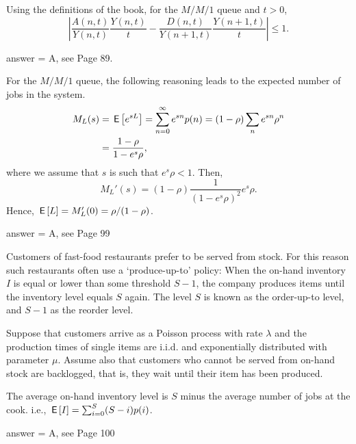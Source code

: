 \begin{exercise}[201803]
Using the definitions of the book, for the $M/M/1$ queue and $t>0$, 
\begin{equation*}
\left|  \frac{A(n,t)}{Y(n,t)}\frac{Y(n,t)}t - \frac{D(n,t)}{Y(n+1,t)}\frac{Y(n+1,t)}t \right| \leq 1. 
\end{equation*}
\begin{solution}
answer = A, see Page 89. 
\end{solution}
\end{exercise}

\begin{exercise}[201803]
For the $M/M/1$ queue, the following reasoning leads to the expected number of jobs in the system.
\begin{equation*}
  \begin{split}
  M_L(s) 
&= \,\mathsf{E}\left[e^{s L}\right] = \sum_{n=0}^\infty e^{s n}p(n) = (1-\rho) \sum_n e^{s n} \rho^n \\
&=\frac{1-\rho}{1-e^{s}\rho},
  \end{split}
\end{equation*}
where we assume that $s$ is such that $e^s \rho < 1$. Then, 
\begin{equation*}
  M_L'(s) = (1-\rho) \frac{1}{(1-e^s\rho)^2} e^s \rho.
\end{equation*}
Hence, $\,\mathsf{E}\left[L\right] = M_L'(0) = \rho/(1-\rho)$.
\begin{solution}
answer = A, see Page 99
\end{solution}
\end{exercise}

\begin{exercise}[201803]
Customers of fast-food restaurants prefer to be served from stock. For this reason such
restaurants often use a `produce-up-to' policy: When the on-hand inventory $I$ is equal or lower than some threshold $S-1$, the company produces items until the inventory level equals $S$ again. The level $S$ is known as the order-up-to level, and $S-1$ as the reorder level.

Suppose that customers arrive as a Poisson process with rate $\lambda$
and the production times of single items are i.i.d. and exponentially
distributed with parameter $\mu$. Assume also that customers who
cannot be served from on-hand stock are backlogged, that is, they wait
until their item has been produced. 

The average on-hand inventory level is $S$ minus the average number of jobs at the cook. i.e., $\,\mathsf{E}\left[I\right] = \sum_{i=0}^{S} (S-i) p(i)$. 
\begin{solution}
answer = A, see Page 100
\end{solution}
\end{exercise}


